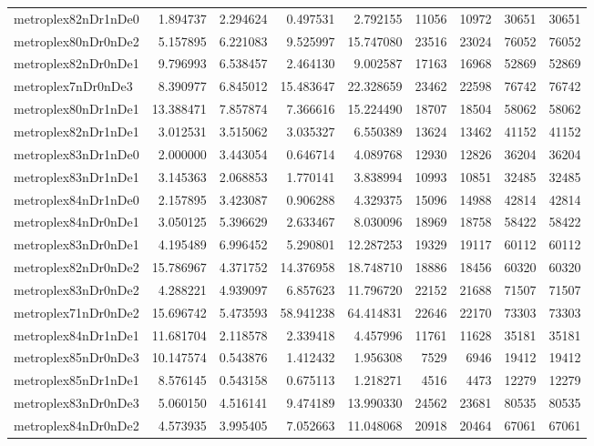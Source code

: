 \begin{longtable}{|l|r|r|r|r|r|r|r|r|}
metroplex82nDr1nDe0 & 1.894737 & 2.294624 & 0.497531 & 2.792155 & 11056 & 10972 & 30651 & 30651 \\
metroplex80nDr0nDe2 & 5.157895 & 6.221083 & 9.525997 & 15.747080 & 23516 & 23024 & 76052 & 76052 \\
metroplex82nDr0nDe1 & 9.796993 & 6.538457 & 2.464130 & 9.002587 & 17163 & 16968 & 52869 & 52869 \\
metroplex7nDr0nDe3 & 8.390977 & 6.845012 & 15.483647 & 22.328659 & 23462 & 22598 & 76742 & 76742 \\
metroplex80nDr1nDe1 & 13.388471 & 7.857874 & 7.366616 & 15.224490 & 18707 & 18504 & 58062 & 58062 \\
metroplex82nDr1nDe1 & 3.012531 & 3.515062 & 3.035327 & 6.550389 & 13624 & 13462 & 41152 & 41152 \\
metroplex83nDr1nDe0 & 2.000000 & 3.443054 & 0.646714 & 4.089768 & 12930 & 12826 & 36204 & 36204 \\
metroplex83nDr1nDe1 & 3.145363 & 2.068853 & 1.770141 & 3.838994 & 10993 & 10851 & 32485 & 32485 \\
metroplex84nDr1nDe0 & 2.157895 & 3.423087 & 0.906288 & 4.329375 & 15096 & 14988 & 42814 & 42814 \\
metroplex84nDr0nDe1 & 3.050125 & 5.396629 & 2.633467 & 8.030096 & 18969 & 18758 & 58422 & 58422 \\
metroplex83nDr0nDe1 & 4.195489 & 6.996452 & 5.290801 & 12.287253 & 19329 & 19117 & 60112 & 60112 \\
metroplex82nDr0nDe2 & 15.786967 & 4.371752 & 14.376958 & 18.748710 & 18886 & 18456 & 60320 & 60320 \\
metroplex83nDr0nDe2 & 4.288221 & 4.939097 & 6.857623 & 11.796720 & 22152 & 21688 & 71507 & 71507 \\
metroplex71nDr0nDe2 & 15.696742 & 5.473593 & 58.941238 & 64.414831 & 22646 & 22170 & 73303 & 73303 \\
metroplex84nDr1nDe1 & 11.681704 & 2.118578 & 2.339418 & 4.457996 & 11761 & 11628 & 35181 & 35181 \\
metroplex85nDr0nDe3 & 10.147574 & 0.543876 & 1.412432 & 1.956308 & 7529 & 6946 & 19412 & 19412 \\
metroplex85nDr1nDe1 & 8.576145 & 0.543158 & 0.675113 & 1.218271 & 4516 & 4473 & 12279 & 12279 \\
metroplex83nDr0nDe3 & 5.060150 & 4.516141 & 9.474189 & 13.990330 & 24562 & 23681 & 80535 & 80535 \\
metroplex84nDr0nDe2 & 4.573935 & 3.995405 & 7.052663 & 11.048068 & 20918 & 20464 & 67061 & 67061 \\

\end{longtable}
